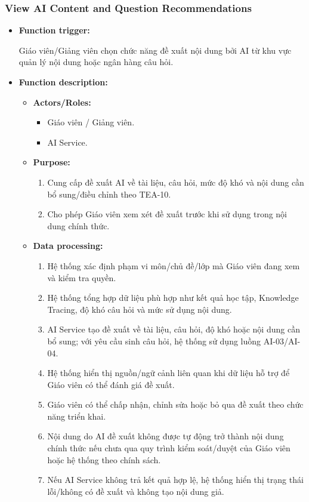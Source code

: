 \documentclass[12pt,a4paper,oneside]{report}
\begin{document}
\subsubsection{View AI Content and Question Recommendations}
\label{subsubsec:view-ai-content-question-recommendations}

\begin{itemize}

    \item \textbf{Function trigger:}

    Giáo viên/Giảng viên chọn chức năng đề xuất nội dung bởi AI từ khu vực quản lý nội dung hoặc ngân hàng câu hỏi.

    \item \textbf{Function description:}

    \begin{itemize}

        \item \textbf{Actors/Roles:}
        \begin{itemize}
            \item Giáo viên / Giảng viên.
            \item AI Service.
        \end{itemize}

        \item \textbf{Purpose:}
        \begin{enumerate}
            \item Cung cấp đề xuất AI về tài liệu, câu hỏi, mức độ khó và nội dung cần bổ sung/điều chỉnh theo TEA-10.
            \item Cho phép Giáo viên xem xét đề xuất trước khi sử dụng trong nội dung chính thức.
        \end{enumerate}

        \item \textbf{Data processing:}
        \begin{enumerate}
            \item Hệ thống xác định phạm vi môn/chủ đề/lớp mà Giáo viên đang xem và kiểm tra quyền.
            \item Hệ thống tổng hợp dữ liệu phù hợp như kết quả học tập, Knowledge Tracing, độ khó câu hỏi và mức sử dụng nội dung.
            \item AI Service tạo đề xuất về tài liệu, câu hỏi, độ khó hoặc nội dung cần bổ sung; với yêu cầu sinh câu hỏi, hệ thống sử dụng luồng AI-03/AI-04.
            \item Hệ thống hiển thị nguồn/ngữ cảnh liên quan khi dữ liệu hỗ trợ để Giáo viên có thể đánh giá đề xuất.
            \item Giáo viên có thể chấp nhận, chỉnh sửa hoặc bỏ qua đề xuất theo chức năng triển khai.
            \item Nội dung do AI đề xuất không được tự động trở thành nội dung chính thức nếu chưa qua quy trình kiểm soát/duyệt của Giáo viên hoặc hệ thống theo chính sách.
            \item Nếu AI Service không trả kết quả hợp lệ, hệ thống hiển thị trạng thái lỗi/không có đề xuất và không tạo nội dung giả.
        \end{enumerate}


\end{itemize}
\end{itemize}
\end{document}
